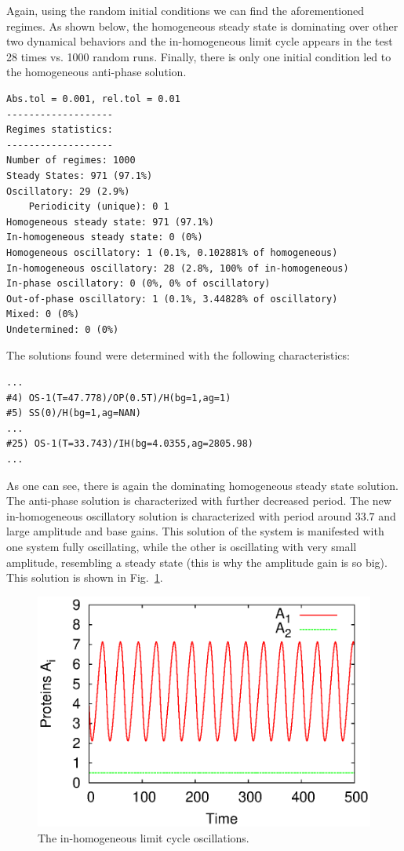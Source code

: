 \documentclass[11pt,a4paper]{article}
\begin{document}
Again, using the random initial conditions we can find the aforementioned regimes. As
shown below, the homogeneous steady state is dominating over other two dynamical
behaviors and the in-homogeneous limit cycle appears in the test 28 times vs. 1000
random runs. Finally, there is only one initial condition led to the homogeneous
anti-phase solution.
\begin{verbatim}
Abs.tol = 0.001, rel.tol = 0.01
-------------------
Regimes statistics:
-------------------
Number of regimes: 1000
Steady States: 971 (97.1%)
Oscillatory: 29 (2.9%)
	Periodicity (unique): 0 1
Homogeneous steady state: 971 (97.1%)
In-homogeneous steady state: 0 (0%)
Homogeneous oscillatory: 1 (0.1%, 0.102881% of homogeneous)
In-homogeneous oscillatory: 28 (2.8%, 100% of in-homogeneous)
In-phase oscillatory: 0 (0%, 0% of oscillatory)
Out-of-phase oscillatory: 1 (0.1%, 3.44828% of oscillatory)
Mixed: 0 (0%)
Undetermined: 0 (0%)
\end{verbatim}

The solutions found were determined with the following characteristics:
\begin{verbatim}
...
#4) OS-1(T=47.778)/OP(0.5T)/H(bg=1,ag=1)
#5) SS(0)/H(bg=1,ag=NAN)
...
#25) OS-1(T=33.743)/IH(bg=4.0355,ag=2805.98)
...
\end{verbatim}

As one can see, there is again the dominating homogeneous steady state solution. The
anti-phase solution is characterized with further decreased period. The new
in-homogeneous oscillatory solution is characterized with period around $33.7$ and
large amplitude and base gains. This solution of the system is manifested with one
system fully oscillating, while the other is oscillating with very small amplitude,
resembling a steady state (this is why the amplitude gain is so big). This solution
is shown in Fig.~\ref{fig:rB2_ihlc}.

\begin{figure}[!tpbh]
  \centering
  \includegraphics[scale=0.7]{rB2_ihlc}
  \caption{The in-homogeneous limit cycle oscillations.}
  \label{fig:rB2_ihlc}
\end{figure}
\end{document}
